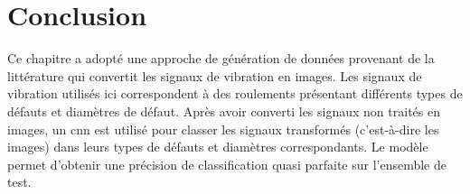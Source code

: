 \section{Conclusion}
Ce chapitre a adopté une approche de génération de données provenant de la littérature qui convertit les signaux de vibration en images. Les signaux de vibration utilisés ici correspondent à des roulements présentant différents types de défauts et diamètres de défaut. Après avoir converti les signaux non traités en images, un \acrshort{cnn} est utilisé pour classer les signaux transformés (c'est-à-dire les images) dans leurs types de défauts et diamètres correspondants. Le modèle permet d'obtenir une précision de classification quasi parfaite sur l'ensemble de test.

